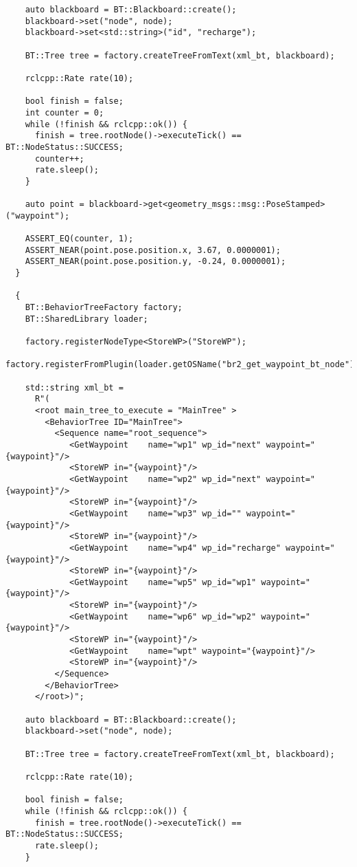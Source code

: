 \begin{tcolorbox}[sharp corners, colframe=gray!80, colback=LightGray, left=0pt, top=0pt, bottom=0pt, title=\texttt{br2\_bt\_patrolling/tests/bt\_action\_test.cpp}]
\begin{verbatim}
    auto blackboard = BT::Blackboard::create();
    blackboard->set("node", node);
    blackboard->set<std::string>("id", "recharge");

    BT::Tree tree = factory.createTreeFromText(xml_bt, blackboard);

    rclcpp::Rate rate(10);

    bool finish = false;
    int counter = 0;
    while (!finish && rclcpp::ok()) {
      finish = tree.rootNode()->executeTick() == BT::NodeStatus::SUCCESS;
      counter++;
      rate.sleep();
    }

    auto point = blackboard->get<geometry_msgs::msg::PoseStamped>("waypoint");

    ASSERT_EQ(counter, 1);
    ASSERT_NEAR(point.pose.position.x, 3.67, 0.0000001);
    ASSERT_NEAR(point.pose.position.y, -0.24, 0.0000001);
  }

  {
    BT::BehaviorTreeFactory factory;
    BT::SharedLibrary loader;

    factory.registerNodeType<StoreWP>("StoreWP");
    factory.registerFromPlugin(loader.getOSName("br2_get_waypoint_bt_node"));

    std::string xml_bt =
      R"(
      <root main_tree_to_execute = "MainTree" >
        <BehaviorTree ID="MainTree">
          <Sequence name="root_sequence">
             <GetWaypoint    name="wp1" wp_id="next" waypoint="{waypoint}"/>
             <StoreWP in="{waypoint}"/>
             <GetWaypoint    name="wp2" wp_id="next" waypoint="{waypoint}"/>
             <StoreWP in="{waypoint}"/>
             <GetWaypoint    name="wp3" wp_id="" waypoint="{waypoint}"/>
             <StoreWP in="{waypoint}"/>
             <GetWaypoint    name="wp4" wp_id="recharge" waypoint="{waypoint}"/>
             <StoreWP in="{waypoint}"/>
             <GetWaypoint    name="wp5" wp_id="wp1" waypoint="{waypoint}"/>
             <StoreWP in="{waypoint}"/>
             <GetWaypoint    name="wp6" wp_id="wp2" waypoint="{waypoint}"/>
             <StoreWP in="{waypoint}"/>
             <GetWaypoint    name="wpt" waypoint="{waypoint}"/>
             <StoreWP in="{waypoint}"/>
          </Sequence>
        </BehaviorTree>
      </root>)";

    auto blackboard = BT::Blackboard::create();
    blackboard->set("node", node);

    BT::Tree tree = factory.createTreeFromText(xml_bt, blackboard);

    rclcpp::Rate rate(10);

    bool finish = false;
    while (!finish && rclcpp::ok()) {
      finish = tree.rootNode()->executeTick() == BT::NodeStatus::SUCCESS;
      rate.sleep();
    }


\end{verbatim}
\end{tcolorbox}
